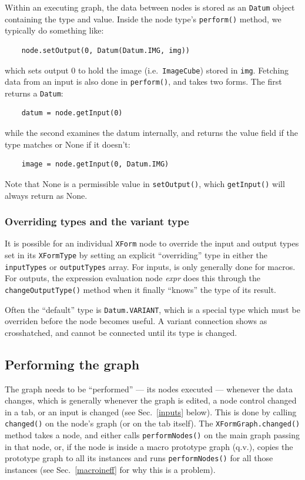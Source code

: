 Within an executing graph, the data between nodes is stored as an \texttt{Datum}
object containing the type and value. Inside the node type's \texttt{perform()} method,
we typically do something like:
\begin{lstlisting}
    node.setOutput(0, Datum(Datum.IMG, img))
\end{lstlisting}
which sets output 0 to hold the image (i.e.\ \texttt{ImageCube}) stored in \texttt{img}.
Fetching data from an input is also done in \texttt{perform()}, and takes two forms. The
first returns a \texttt{Datum}:
\begin{lstlisting}
    datum = node.getInput(0)
\end{lstlisting}
while the second examines the datum internally, and returns the value field if
the type matches or None if it doesn't:
\begin{lstlisting}
    image = node.getInput(0, Datum.IMG)
\end{lstlisting}
Note that None is a permissible value in \texttt{setOutput()}, which \texttt{getInput()} will
always return as None.

\subsubsection{Overriding types and the variant type}

It is possible for an individual \texttt{XForm} node to override the input and
output types set in its \texttt{XFormType} by setting an explicit
``overriding'' type in either the \texttt{inputTypes} or \texttt{outputTypes}
array. For inputs, is only generally done for macros. For outputs, the
expression evaluation node \emph{expr} does this through the
\texttt{changeOutputType()} method when it finally ``knows'' the type of its
result.

Often the ``default'' type is \texttt{Datum.VARIANT},
which is a special type which must be overriden before the
node becomes useful. A variant connection shows as crosshatched, and cannot be
connected until its type is changed.

\subsection{Performing the graph}
\label{graphperform}
The graph needs to be ``performed'' --- its nodes executed --- whenever
the data changes, which is generally whenever the graph is edited,
a node control changed in a tab, or an input is changed (see Sec.~\ref{inputs}
below).
This is done by calling \texttt{changed()} on the node's graph (or on the tab itself).
The \texttt{XFormGraph.changed()} method takes a node, and either calls
\texttt{performNodes()} on the main graph passing in that node, or, if the
node is inside a macro prototype graph (q.v.), copies the prototype graph to
all its instances and runs \texttt{performNodes()} for all those instances
(see Sec.~\ref{macroineff} for why this is a problem).

